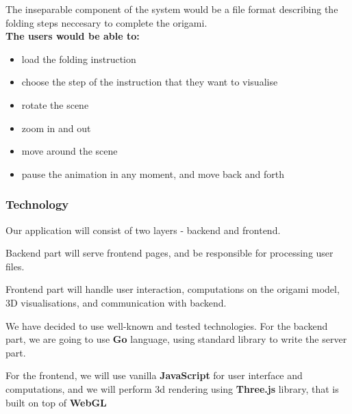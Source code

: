 The inseparable component of the system would be a file format describing the folding steps neccesary to complete the origami.\\

\noindent \textbf{The users would be able to:}
\begin{itemize}
	\item load the folding instruction
	\item choose the step of the instruction that they want to visualise
	\item rotate the scene
    \item zoom in and out
	\item move around the scene
	\item pause the animation in any moment, and move back and forth
\end{itemize}

\subsubsection{Technology}

Our application will consist of two layers - backend and frontend.

Backend part will serve frontend pages, and be responsible
for processing user files.

Frontend part will handle user interaction, computations on the origami model,
3D visualisations, and communication with backend.

We have decided to use well-known and tested technologies.
For the backend part, we are going to use \textbf{Go} language,
using standard library to write the server part.

For the frontend, we will use vanilla \textbf{JavaScript}
for user interface and computations,
and we will perform 3d rendering using \textbf{Three.js} library,
that is built on top of \textbf{WebGL}

